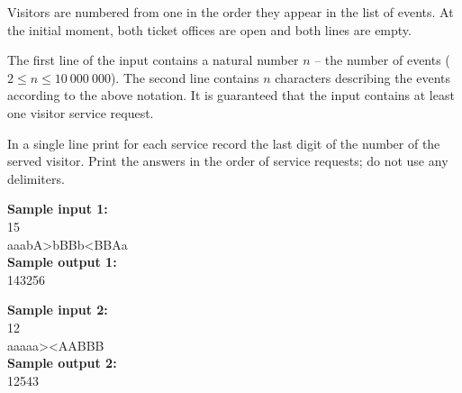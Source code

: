 \documentclass[a4paper]{article}
\begin{document}
Visitors are numbered from one in the order they appear in the list of events. At the initial moment, both ticket offices are open and both lines are empty.

The first line of the input contains a natural number $n$ -- the number of events ($2 \le n \le 10 \ 000 \ 000$). The second line contains $n$ characters describing the events according to the above notation. It is guaranteed that the input contains at least one visitor service request.

In a single line print for each service record the last digit of the number of the served visitor. Print the answers in the order of service requests; do not use any delimiters.

\LINE

\noindent \textbf{Sample input 1:}\\
15\\
aaabA>bBBb<BBAa\\

\noindent \textbf{Sample output 1:}\\
143256\\

\SPACE

\noindent \textbf{Sample input 2:}\\
12\\
aaaaa><AABBB\\

\noindent \textbf{Sample output 2:}\\
12543\\
\end{document}
